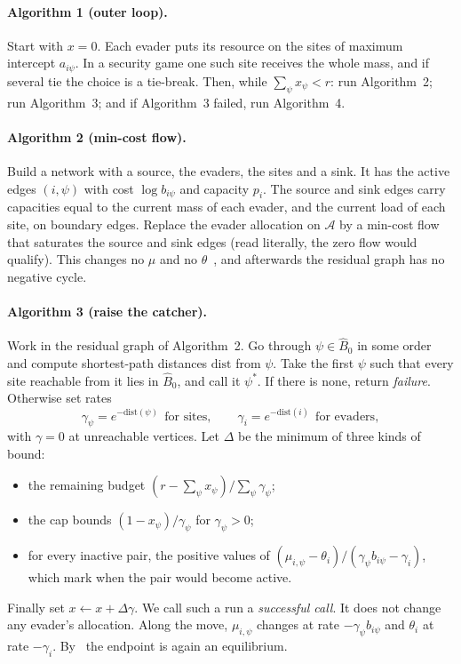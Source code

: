 \paragraph{Algorithm 1 (outer loop).} Start with $x=0$. Each evader puts its resource on the sites of
maximum intercept $a_{i\psi}$. In a security game one such site receives the whole mass, and if several
tie the choice is a tie-break. Then, while $\sum_\psi x_\psi<r$: run Algorithm~2; run Algorithm~3; and if
Algorithm~3 failed, run Algorithm~4.

\paragraph{Algorithm 2 (min-cost flow).} Build a network with a source, the evaders, the sites and a
sink. It has the active edges $(i,\psi)$ with cost $\log b_{i\psi}$ and capacity $p_i$. The source and
sink edges carry capacities equal to the current mass of each evader, and the current load of each site,
on boundary edges. Replace the evader allocation on $\mathcal A$ by a min-cost flow that saturates the source and sink edges (read literally, the zero flow would qualify). This changes no $\mu$
and no $\theta$~\cite[Lemma~2]{lck16}, and afterwards the residual graph has no negative cycle.

\paragraph{Algorithm 3 (raise the catcher).} Work in the residual graph of Algorithm~2. Go through
$\psi\in\hat B_0$ in some order and compute shortest-path distances $\mathrm{dist}$ from $\psi$. Take the
first $\psi$ such that every site reachable from it lies in $\hat B_0$, and call it $\psi^*$. If there is
none, return \emph{failure}. Otherwise set rates
\[
 \gamma_\psi=e^{-\mathrm{dist}(\psi)}\ \ \text{for sites},\qquad \gamma_i=e^{-\mathrm{dist}(i)}\ \ \text{for evaders},
\]
with $\gamma=0$ at unreachable vertices. Let $\Delta$ be the minimum of three kinds of bound:
\begin{itemize}[nosep]
\item the remaining budget $(r-\sum_\psi x_\psi)/\sum_\psi\gamma_\psi$;
\item the cap bounds $(1-x_\psi)/\gamma_\psi$ for $\gamma_\psi>0$;
\item for every inactive pair, the positive values of $(\mu_{i,\psi}-\theta_i)/(\gamma_\psi b_{i\psi}-\gamma_i)$,
which mark when the pair would become active.
\end{itemize}
Finally set $x\leftarrow x+\Delta\gamma$. We call such a run a \emph{successful call}. It does not change
any evader's allocation. Along the move, $\mu_{i,\psi}$ changes at rate $-\gamma_\psi b_{i\psi}$ and
$\theta_i$ at rate $-\gamma_i$. By~\cite[Lemma~4]{lck16} the endpoint is again an equilibrium.


